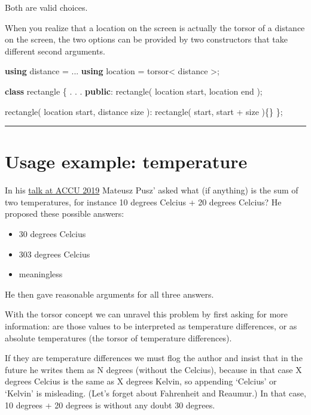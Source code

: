 \documentclass[]{article}
\newenvironment{Shaded}{}{}
\newcommand{\KeywordTok}[1]{\textcolor[rgb]{0.00,0.44,0.13}{\textbf{#1}}}
\newcommand{\NormalTok}[1]{#1}
\begin{document}
Both are valid choices.

When you realize that a location on the screen is actually the torsor of
a distance on the screen, the two options can be provided by two
constructors that take different second arguments.

\begin{Shaded}
\begin{Highlighting}[]
\KeywordTok{using}\NormalTok{ distance = ...}
\KeywordTok{using}\NormalTok{ location = torsor< distance >;}

\KeywordTok{class}\NormalTok{ rectangle \{}
\NormalTok{   . . .}
\KeywordTok{public}\NormalTok{:}
\NormalTok{   rectangle( location start, location end );}
   
\NormalTok{   rectangle( location start, distance size ): }
\NormalTok{      rectangle( start, start + size )\{\}}
\NormalTok{\}; }
\end{Highlighting}
\end{Shaded}

\begin{center}\rule{0.5\linewidth}{\linethickness}\end{center}

\hypertarget{usage-example-temperature}{%
\section{Usage example: temperature}\label{usage-example-temperature}}

In his \href{https://www.youtube.com/watch?v=nN5ya6oNImg}{talk at ACCU
2019} Mateusz Pusz' asked what (if anything) is the sum of two
temperatures, for instance 10 degrees Celcius + 20 degrees Celcius? He
proposed these possible answers:

\begin{itemize}
\item
  30 degrees Celcius
\item
  303 degrees Celcius
\item
  meaningless
\end{itemize}

He then gave reasonable arguments for all three answers.

With the torsor concept we can unravel this problem by first asking for
more information: are those values to be interpreted as temperature
differences, or as absolute temperatures (the torsor of temperature
differences).

If they are temperature differences we must flog the author and insist
that in the future he writes them as N degrees (without the Celcius),
because in that case X degrees Celcius is the same as X degrees Kelvin,
so appending `Celcius' or `Kelvin' is misleading. (Let's forget about
Fahrenheit and Reaumur.) In that case, 10 degrees + 20 degrees is
without any doubt 30 degrees.
\end{document}
